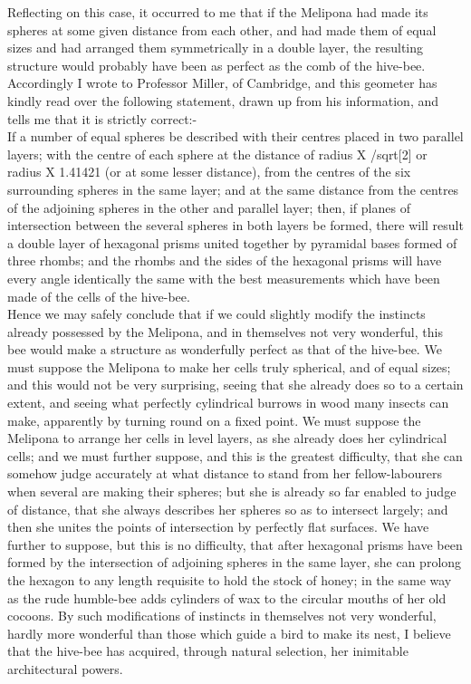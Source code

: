 \indent Reflecting on this case, it occurred to me that if the Melipona had made its spheres at some given distance from each other, and had made them of equal sizes and had arranged them symmetrically in a double layer, the resulting structure would probably have been as perfect as the comb of the hive-bee. Accordingly I wrote to Professor Miller, of Cambridge, and this geometer has kindly read over the following statement, drawn up from his information, and tells me that it is strictly correct:-\\
\indent If a number of equal spheres be described with their centres placed in two parallel layers; with the centre of each sphere at the distance of radius X /sqrt[2] or radius X 1.41421 (or at some lesser distance), from the centres of the six surrounding spheres in the same layer; and at the same distance from the centres of the adjoining spheres in the other and parallel layer; then, if planes of intersection between the several spheres in both layers be formed, there will result a double layer of hexagonal prisms united together by pyramidal bases formed of three rhombs; and the rhombs and the sides of the hexagonal prisms will have every angle identically the same with the best measurements which have been made of the cells of the hive-bee.\\
\indent Hence we may safely conclude that if we could slightly modify the instincts already possessed by the Melipona, and in themselves not very wonderful, this bee would make a structure as wonderfully perfect as that of the hive-bee. We must suppose the Melipona to make her cells truly spherical, and of equal sizes; and this would not be very surprising, seeing that she already does so to a certain extent, and seeing what perfectly cylindrical burrows in wood many insects can make, apparently by turning round on a fixed point. We must suppose the Melipona to arrange her cells in level layers, as she already does her cylindrical cells; and we must further suppose, and this is the greatest difficulty, that she can somehow judge accurately at what distance to stand from her fellow-labourers when several are making their spheres; but she is already so far enabled to judge of distance, that she always describes her spheres so as to intersect largely; and then she unites the points of intersection by perfectly flat surfaces. We have further to suppose, but this is no difficulty, that after hexagonal prisms have been formed by the intersection of adjoining spheres in the same layer, she can prolong the hexagon to any length requisite to hold the stock of honey; in the same way as the rude humble-bee adds cylinders of wax to the circular mouths of her old cocoons. By such modifications of instincts in themselves not very wonderful, hardly more wonderful than those which guide a bird to make its nest, I believe that the hive-bee has acquired, through natural selection, her inimitable architectural powers.\\
